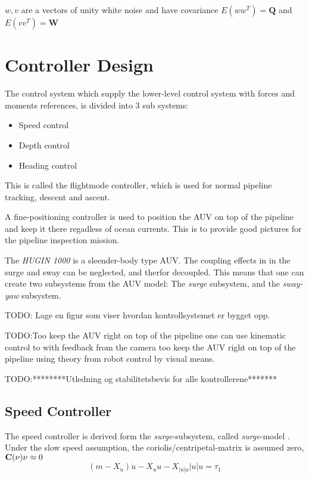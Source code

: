 	$w, v$ are a vectors of unity white noise and have covariance $E(ww^T) = \mathbf{Q}$ and $E(vv^T) =
	\mathbf{W}$




	
\section{Controller Design}
	The control system which supply the lower-level control system with forces and moments references, is 
	divided into 3 sub systems:
		\begin{itemize}
		 \item Speed control
		 \item Depth control
		 \item Heading control
		\end{itemize}
	This is called the flightmode controller, which is used for normal pipeline tracking, descent and ascent. 
	
	A fine-positioning controller is used to position the AUV on top of the pipeline and keep it there regadless 
	of ocean currents. This is to provide good pictures for the pipeline inspection mission.
	
	The \textit{HUGIN 1000} is a sleender-body type AUV. The coupling effects in in the surge and sway can be 
	neglected, and therfor decoupled. This means that one can create two subsystems from the AUV model: 
	The \textit{surge} subsystem, and the \textit{sway-yaw} subsystem. 
	
	TODO: Lage en figur som viser hvordan kontrollsystemet er bygget opp.
	
	TODO:Too keep the AUV right on top of the pipeline one can use kinematic control to with feedback from the 
	camera too keep the AUV right on top of the pipeline using theory from robot control by visual means.
	
	
	TODO:********Utledning og stabilitetsbevis for alle kontrollerene*******
	\subsection{Speed Controller}
		The speed controller is derived form the \textit{surge}-subsystem, called \textit{surge}-model
		\cite{fossen}. Under the slow speed assumption, the coriolis/centripetal-matrix is assumed
		zero, $\mathbf{C}(\mathbf{\nu})\mathbf{\nu} \approx 0$  
		\begin{equation}
			(m - X_{\dot{u}})\dot{u} - X_u u - X_{|u|u}|u| u = \tau_1
		\end{equation}
	
